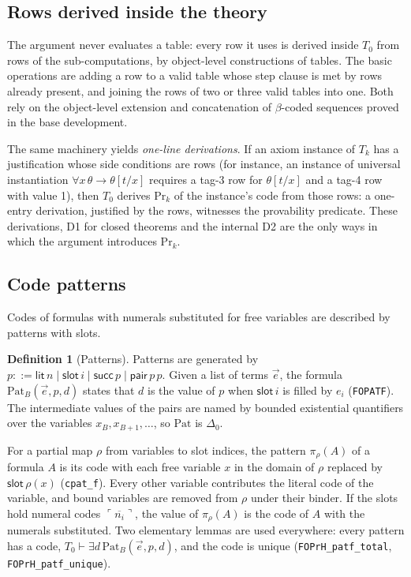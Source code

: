 \documentclass[11pt]{article}
\theoremstyle{plain}
\theoremstyle{definition}
\newtheorem{definition}[theorem]{Definition}
\theoremstyle{remark}
\newcommand{\T}[1]{T_{#1}}
\newcommand{\Prv}{\mathrm{Pr}}
\newcommand{\gn}[1]{\ulcorner #1 \urcorner}
\newcommand{\num}[1]{\overline{#1}}
\newcommand{\Pat}{\mathrm{Pat}}
\newcommand{\rocq}[1]{\texttt{#1}}
\newcommand{\Ddelta}{\Delta_0}
\begin{document}
\subsection{Rows derived inside the theory}\label{sec:rows}

The argument never evaluates a table: every row it uses is derived
inside $\T0$ from rows of the sub-computations, by object-level
constructions of tables.  The basic operations are adding a row to a
valid table whose step clause is met by rows already present, and
joining the rows of two or three valid tables into one.  Both rely on
the object-level extension and concatenation of $\beta$-coded sequences
proved in the base development.

The same machinery yields \emph{one-line derivations}.  If an axiom
instance of $\T{k}$ has a justification whose side conditions are rows
(for instance, an instance of universal instantiation
$\forall x\,\theta \to \theta[t/x]$ requires a tag-3 row for
$\theta[t/x]$ and a tag-4 row with value 1), then $\T0$ derives
$\Prv_k$ of the instance's code from those rows: a one-entry derivation,
justified by the rows, witnesses the provability predicate.  These
derivations, D1 for closed theorems and the internal D2 are the only
ways in which the argument introduces $\Prv_k$.

\subsection{Code patterns}\label{sec:patterns}

Codes of formulas with numerals substituted for free variables are
described by patterns with slots.

\begin{definition}[Patterns]
Patterns are generated by $p ::= \mathsf{lit}\,n \mid \mathsf{slot}\,i
\mid \mathsf{succ}\,p \mid \mathsf{pair}\,p\,p$.  Given a list of terms
$\vec e$, the formula $\Pat_B(\vec e, p, d)$ states that $d$ is the value
of $p$ when $\mathsf{slot}\,i$ is filled by $e_i$
(\rocq{FOPATF}).  The intermediate values of the pairs are named by
bounded existential quantifiers over the variables $x_B, x_{B+1},\dots$,
so $\Pat$ is $\Ddelta$.
\end{definition}

For a partial map $\rho$ from variables to slot indices, the pattern
$\pi_\rho(A)$ of a formula $A$ is its code with each free variable $x$ in
the domain of $\rho$ replaced by $\mathsf{slot}\,\rho(x)$
(\rocq{cpat\_f}).  Every other variable contributes the literal code of
the variable, and bound variables are removed from $\rho$ under their
binder.  If the slots hold numeral codes $\gn{\num{n_i}}$, the value of
$\pi_\rho(A)$ is the code of $A$ with the numerals substituted.  Two
elementary lemmas are used everywhere: every pattern has a code,
$\T0 \vdash \exists d\, \Pat_B(\vec e, p, d)$, and the code is unique
(\rocq{FOPrH\_patf\_total}, \rocq{FOPrH\_patf\_unique}).
\end{document}
